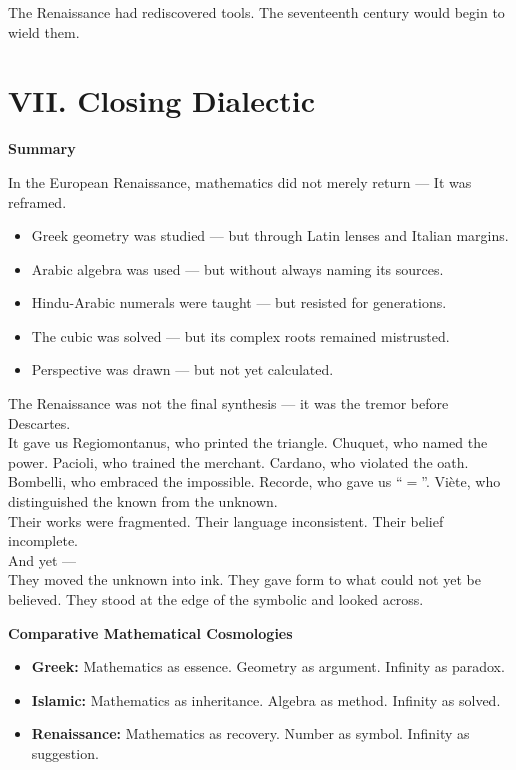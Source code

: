 \documentclass[9pt]{article}
\begin{document}
The Renaissance had rediscovered tools.  
The seventeenth century would begin to wield them.




\newpage

\section*{VII. Closing Dialectic}

\textbf{Summary}

In the European Renaissance, mathematics did not merely return —  
It was reframed.

\begin{itemize}
    \item Greek geometry was studied — but through Latin lenses and Italian margins.
    \item Arabic algebra was used — but without always naming its sources.
    \item Hindu-Arabic numerals were taught — but resisted for generations.
    \item The cubic was solved — but its complex roots remained mistrusted.
    \item Perspective was drawn — but not yet calculated.
\end{itemize}

The Renaissance was not the final synthesis — it was the tremor before Descartes.\\

It gave us Regiomontanus, who printed the triangle.  
Chuquet, who named the power.  
Pacioli, who trained the merchant.  
Cardano, who violated the oath.  
Bombelli, who embraced the impossible.  
Recorde, who gave us “$=$”.  
Viète, who distinguished the known from the unknown.\\

Their works were fragmented.  
Their language inconsistent.  
Their belief incomplete.\\

And yet —\\

They moved the unknown into ink.  
They gave form to what could not yet be believed.  
They stood at the edge of the symbolic and looked across.

\textbf{Comparative Mathematical Cosmologies}

\begin{itemize}
    \item \textbf{Greek:} Mathematics as essence. Geometry as argument. Infinity as paradox.
    \item \textbf{Islamic:} Mathematics as inheritance. Algebra as method. Infinity as solved.
    \item \textbf{Renaissance:} Mathematics as recovery. Number as symbol. Infinity as suggestion.
\end{itemize}
\end{document}
